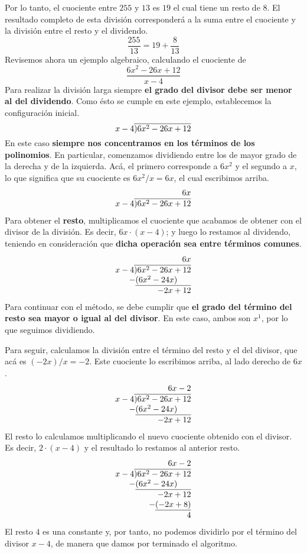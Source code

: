 \documentclass[12pt]{article}
\begin{document}
Por lo tanto, el cuociente entre $255$ y $13$ es $19$ el cual tiene un resto de $8$. El resultado completo de esta división corresponderá a la suma entre el cuociente y la división entre el resto y el dividendo.
\[
  \frac{255}{13} = 19 + \frac{8}{13}
\]
Revisemos ahora un ejemplo algebraico, calculando el cuociente de
\[
  \frac{6x^{2} - 26x + 12}{x - 4}
\]
Para realizar la división larga siempre \textbf{el grado del divisor debe ser menor al del dividendo}. Como ésto se cumple en este ejemplo, establecemos la configuración inicial.
\[
  x - 4 \overline{\smash{)} 6x^{2} - 26x + 12}
\]
En este caso \textbf{siempre nos concentramos en los términos de los polinomios}. En particular, comenzamos dividiendo entre los de mayor grado de la derecha y de la izquierda. Acá, el primero corresponde a $6x^{2}$ y el segundo a $x$, lo que significa que su cuociente es $6x^{2}/x = 6x$, el cual escribimos arriba.
\[
\begin{array}{r}
6x \\
x - 4 \overline{\smash{)} 6x^{2} - 26x + 12}
\end{array}
\]
Para obtener el \textbf{resto}, multiplicamos el cuociente que acabamos de obtener con el divisor de la división. Es decir, $6x \cdot (x - 4)$; y luego lo restamos al dividendo, teniendo en consideración que \textbf{dicha operación sea entre términos comunes}.
\[
\begin{array}{r}
6x \\
x - 4 \overline{\smash{)} 6x^{2} - 26x + 12} \\
- \underline{(6x^{2} - 24x) \text{ } \text{ } \text{ } \text{ } \text{ }} \\
-2x + 12
\end{array}
\]
Para continuar con el método, se debe cumplir que \textbf{el grado del término del resto sea mayor o igual al del divisor}. En este caso, ambos son $x^{1}$, por lo que seguimos dividiendo.

Para seguir, calculamos la división entre el término del resto y el del divisor, que acá es $(-2x)/x = -2$. Este cuociente lo escribimos arriba, al lado derecho de $6x$.
\[
\begin{array}{r}
6x - 2 \\
x - 4 \overline{\smash{)} 6x^{2} - 26x + 12} \\
- \underline{(6x^{2} - 24x) \text{ } \text{ } \text{ } \text{ } \text{ }} \\
-2x + 12
\end{array}
\]
El resto lo calculamos multiplicando el nuevo cuociente obtenido con el divisor. Es decir, $2 \cdot (x - 4)$ y el resultado lo restamos al anterior resto.
\[
\begin{array}{r}
6x - 2 \\
x - 4 \overline{\smash{)} 6x^{2} - 26x + 12} \\
- \underline{(6x^{2} - 24x) \text{ } \text{ } \text{ } \text{ } \text{ }} \\
-2x + 12 \\
-\underline{(-2x + 8)} \\
4
\end{array}
\]
El resto $4$ es una constante y, por tanto, no podemos dividirlo por el término del divisor $x - 4$, de manera que damos por terminado el algoritmo.
\end{document}
